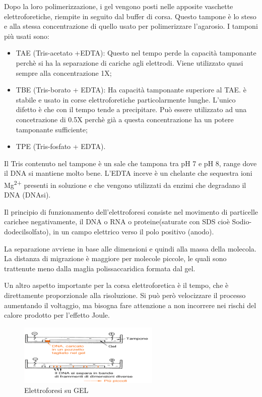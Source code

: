 Dopo la loro polimerizzazione, i gel vengono posti nelle apposite vaschette elettroforetiche, riempite in seguito dal buffer di corsa. 
Questo tampone è lo steso e alla stessa concentrazione di quello usato per polimerizzare l'agarosio. 
\vspace{0.3cm}
I tamponi più usati sono: 
\begin{itemize}

\item{TAE (Tris-acetato +EDTA): } Questo nel tempo perde la capacità tamponante perchè si ha la separazione di cariche agli elettrodi. Viene utilizzato quasi sempre alla concentrazione 1X; 

\item{TBE (Tris-borato + EDTA):} Ha capacità tamponante superiore al TAE. è stabile e usato in corse elettroforetiche particolarmente lunghe. L'unico difetto è che con il tempo tende a precipitare. Può essere utilizzato ad una concetrazione di 0.5X perchè già a questa concentrazione ha un potere tamponante sufficiente;

\item{TPE (Tris-fosfato + EDTA).}

 \end{itemize}

Il Tris contenuto nel tampone è un sale che tampona tra pH 7 e pH 8, range dove il DNA si mantiene molto bene. L'EDTA inceve è un chelante che sequestra ioni Mg\textsuperscript{2+} presenti in soluzione e che vengono utilizzati da enzimi che degradano il DNA (DNAsi). 

Il principio di funzionamento dell'elettroforesi consiste nel movimento di particelle carichee negativamente, il DNA o RNA o proteine(saturate con SDS cioè Sodio-dodecilsolfato), in un campo elettrico verso il polo positivo (anodo). 

La separazione avviene in base alle dimensioni e quindi alla massa della molecola. La distanza di migrazione è maggiore per molecole piccole, le quali sono trattenute meno dalla maglia polissaccaridica formata dal gel. 

Un altro aspetto importante per la corsa elettroforetica è il tempo, che è direttamente proporzionale alla risoluzione. Si può però velocizzare il processo aumentando il voltaggio, ma bisogna fare attenzione a non incorrere nei rischi del calore prodotto per l'effetto Joule. 

\begin{figure}[H]

	\centering
	\includegraphics[width=0.6\textwidth]{./immagini/elettroforesi.png}
	\caption{Elettroforesi su GEL}
	\label{elettroforesi}

\end{figure}

